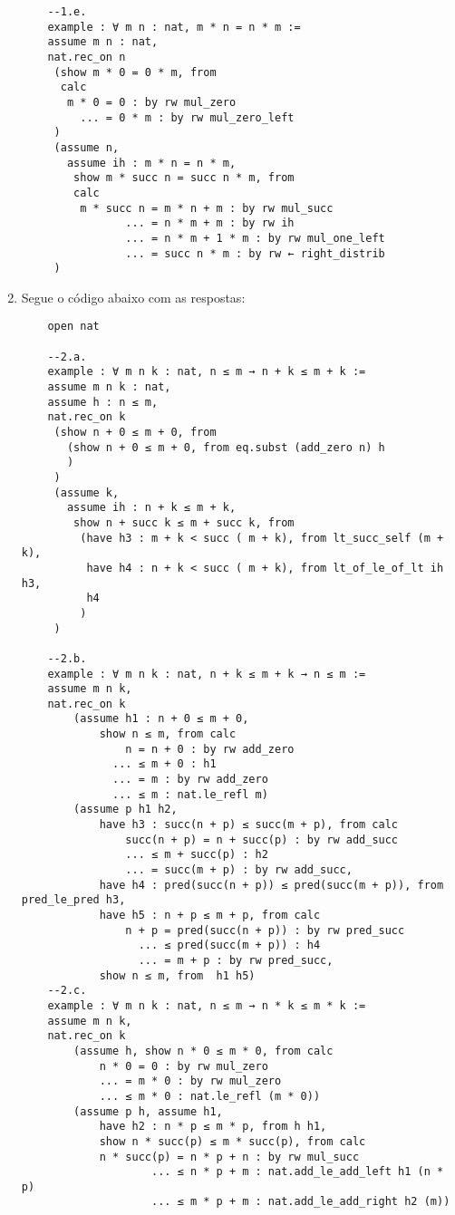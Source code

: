 \begin{enumerate}
\begin{lstlisting}
    --1.e.
    example : ∀ m n : nat, m * n = n * m := 
    assume m n : nat,
    nat.rec_on n 
     (show m * 0 = 0 * m, from
      calc
       m * 0 = 0 : by rw mul_zero
         ... = 0 * m : by rw mul_zero_left
     )
     (assume n,
       assume ih : m * n = n * m,
        show m * succ n = succ n * m, from
        calc
         m * succ n = m * n + m : by rw mul_succ
                ... = n * m + m : by rw ih
                ... = n * m + 1 * m : by rw mul_one_left
                ... = succ n * m : by rw ← right_distrib
     )
    \end{lstlisting}
    
    \item Segue o código abaixo com as respostas:
    
    \begin{lstlisting}
    open nat
    
    --2.a.
    example : ∀ m n k : nat, n ≤ m → n + k ≤ m + k := 
    assume m n k : nat,
    assume h : n ≤ m,
    nat.rec_on k 
     (show n + 0 ≤ m + 0, from 
       (show n + 0 ≤ m + 0, from eq.subst (add_zero n) h
       )
     )
     (assume k,
       assume ih : n + k ≤ m + k,
        show n + succ k ≤ m + succ k, from
         (have h3 : m + k < succ ( m + k), from lt_succ_self (m + k),
          have h4 : n + k < succ ( m + k), from lt_of_le_of_lt ih h3,
          h4
         )
     )
    
    --2.b.
    example : ∀ m n k : nat, n + k ≤ m + k → n ≤ m := 
    assume m n k,
    nat.rec_on k 
        (assume h1 : n + 0 ≤ m + 0,
            show n ≤ m, from calc
                n = n + 0 : by rw add_zero
              ... ≤ m + 0 : h1
              ... = m : by rw add_zero
              ... ≤ m : nat.le_refl m)
        (assume p h1 h2,
            have h3 : succ(n + p) ≤ succ(m + p), from calc
                succ(n + p) = n + succ(p) : by rw add_succ
                ... ≤ m + succ(p) : h2
                ... = succ(m + p) : by rw add_succ,
            have h4 : pred(succ(n + p)) ≤ pred(succ(m + p)), from pred_le_pred h3,
            have h5 : n + p ≤ m + p, from calc
                n + p = pred(succ(n + p)) : by rw pred_succ
                  ... ≤ pred(succ(m + p)) : h4
                  ... = m + p : by rw pred_succ, 
            show n ≤ m, from  h1 h5)
    --2.c.
    example : ∀ m n k : nat, n ≤ m → n * k ≤ m * k := 
    assume m n k,
    nat.rec_on k
        (assume h, show n * 0 ≤ m * 0, from calc
            n * 0 = 0 : by rw mul_zero
            ... = m * 0 : by rw mul_zero
            ... ≤ m * 0 : nat.le_refl (m * 0))
        (assume p h, assume h1, 
            have h2 : n * p ≤ m * p, from h h1,
            show n * succ(p) ≤ m * succ(p), from calc
            n * succ(p) = n * p + n : by rw mul_succ
                    ... ≤ n * p + m : nat.add_le_add_left h1 (n * p)
                    ... ≤ m * p + m : nat.add_le_add_right h2 (m))
    

\end{lstlisting}
\end{enumerate}
